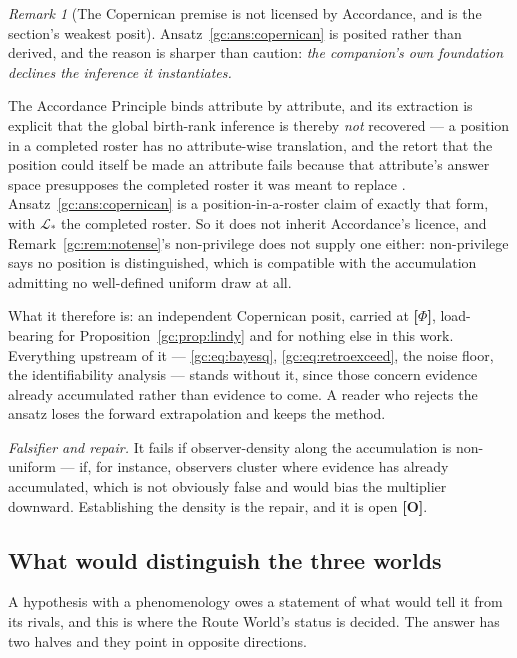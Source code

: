 \documentclass[11pt]{article}
\numberwithin{equation}{section}
\theoremstyle{plain}
\theoremstyle{definition}
\theoremstyle{remark}
\newtheorem{remark}[theorem]{Remark}
\newcommand{\Lc}{\mathcal{L}}
\begin{document}
\begin{remark}[The Copernican premise is not licensed by Accordance, and
is the section's weakest posit]\label{gc:rem:copernicancost}
Ansatz~\ref{gc:ans:copernican} is posited rather than derived, and the reason is sharper than caution: \emph{the companion's
own foundation declines the inference it instantiates.}

The Accordance Principle binds attribute by attribute, and its extraction
is explicit that the global birth-rank inference is thereby \emph{not}
recovered --- a position in a completed roster has no attribute-wise
translation, and the retort that the position could itself be made an
attribute fails because that attribute's answer space presupposes the
completed roster it was meant to replace \cite{NexicFoundation}.
Ansatz~\ref{gc:ans:copernican} is a position-in-a-roster claim of
exactly that form, with $\Lc_\ast$ the completed roster. So it does not
inherit Accordance's licence, and Remark~\ref{gc:rem:notense}'s non-privilege
does not supply one either: non-privilege says no position is
distinguished, which is compatible with the accumulation admitting no
well-defined uniform draw at all.

What it therefore is: an independent Copernican posit, carried at
\textbf{[$\Phi$]}, load-bearing for
Proposition~\ref{gc:prop:lindy} and for nothing else in this work.
Everything upstream of it --- \eqref{gc:eq:bayesq},
\eqref{gc:eq:retroexceed}, the noise floor, the identifiability
analysis --- stands without it, since those concern evidence already
accumulated rather than evidence to come. A reader who rejects the
ansatz loses the forward extrapolation and keeps the method.

\emph{Falsifier and repair.} It fails if observer-density along
the accumulation is non-uniform --- if, for instance, observers cluster
where evidence has already accumulated, which is not obviously false and
would bias the multiplier downward. Establishing the density is the
repair, and it is open \textbf{[O]}.
\end{remark}

\subsection{What would distinguish the three worlds}
\label{gc:sub:discriminate}

A hypothesis with a phenomenology owes a statement of what would tell it
from its rivals, and this is where the Route World's status is decided.
The answer has two halves and they point in opposite directions.
\end{document}
